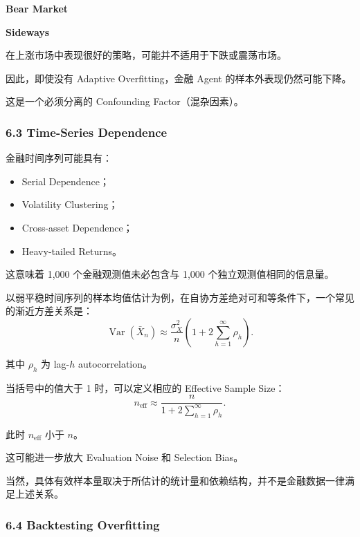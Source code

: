 \textbf{Bear Market}


\textbf{Sideways}


在上涨市场中表现很好的策略，可能并不适用于下跌或震荡市场。

因此，即使没有 Adaptive Overfitting，金融 Agent 的样本外表现仍然可能下降。

这是一个必须分离的 Confounding Factor（混杂因素）。

\hypertarget{part-1-03-0001-time-series-dependence}{%
\subsubsection{6.3 Time-Series Dependence}\label{part-1-03-0001-time-series-dependence}}

金融时间序列可能具有：

\begin{itemize}
\tightlist
\item
  Serial Dependence；
\item
  Volatility Clustering；
\item
  Cross-asset Dependence；
\item
  Heavy-tailed Returns。
\end{itemize}

这意味着 1,000 个金融观测值未必包含与 1,000 个独立观测值相同的信息量。

以弱平稳时间序列的样本均值估计为例，在自协方差绝对可和等条件下，一个常见的渐近方差关系是：
\[\operatorname{Var}(\bar X_n)
\approx
\frac{\sigma_X^2}{n}
\left(
1+2\sum_{h=1}^{\infty}\rho_h
\right).\]

其中 \(\rho_h\) 为 lag-\(h\) autocorrelation。

当括号中的值大于 1 时，可以定义相应的 Effective Sample Size：
\[n_{\mathrm{eff}}
\approx
\frac{n}
{1+2\sum_{h=1}^{\infty}\rho_h}.\]

此时 \(n_{\mathrm{eff}}\) 小于 \(n\)。

这可能进一步放大 Evaluation Noise 和 Selection Bias。

当然，具体有效样本量取决于所估计的统计量和依赖结构，并不是金融数据一律满足上述关系。

\hypertarget{part-1-03-0001-backtesting-overfitting}{%
\subsubsection{6.4 Backtesting Overfitting}\label{part-1-03-0001-backtesting-overfitting}}


